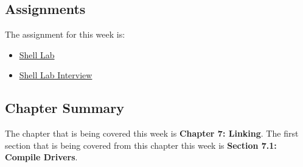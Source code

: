 \subsection{Assignments}

The assignment for this week is:

\begin{itemize}
    \item \href{https://github.com/QuantumCompiler/CU/tree/main/CSPB%202400%20-%20Computer%20Systems/Assignments/Assignment%205%20-%20Shell%20Lab}{Shell Lab}
    \item \href{https://github.com/QuantumCompiler/CU/tree/main/CSPB%202400%20-%20Computer%20Systems/Assignments/Assignment%205%20-%20Shell%20Lab}{Shell Lab Interview}
\end{itemize}

\subsection{Chapter Summary}

The chapter that is being covered this week is \textbf{Chapter 7: Linking}. The first section that is being covered from this chapter this week is \textbf{Section 7.1: Compile Drivers}.

